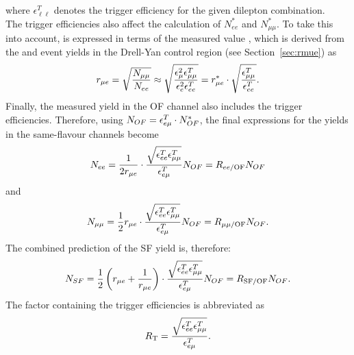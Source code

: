where $\epsilon_{\ell\ell}^T$ denotes the trigger efficiency for the given dilepton combination.\\
The trigger efficiencies also affect the calculation of $N_{ee}^{*}$ and $N_{\mu\mu}^{*}$. To take this into account, \rmuestar is expressed in terms of the measured value \rmue, which is derived from the \EE and \MM event yields in the Drell-Yan control region (see Section~\ref{sec:rmue}) as 
\begin{equation*}
r_{\mu e}  = \sqrt{\frac{N_{\mu\mu}}{N_{ee}}} \approx \sqrt{\frac{\epsilon_{\mu}^2 \epsilon_{\mu\mu}^T}{\epsilon_{e}^2 \epsilon_{ee}^T}} = r_{\mu e}^{*} \cdot \sqrt{\frac{\epsilon_{\mu\mu}^T}{\epsilon_{ee}^T}}.
\end{equation*}
Finally, the measured yield in the OF channel also includes the trigger efficiencies. Therefore, using $N_{OF} = \epsilon_{e\mu}^T \cdot N_{OF}^{*}$, the final expressions for the yields in the same-flavour channels become
\begin{equation}
N_{ee} = \frac{1}{2r_{\mu e}} \cdot \frac{\sqrt{\epsilon_{ee}^T \epsilon_{\mu\mu}^T}}{\epsilon_{e\mu}^T} N_{OF} = R_\text{$ee$/OF} N_{OF}
\label{eq:nee}
\end{equation} 
and
\begin{equation}
N_{\mu\mu} = \frac{1}{2}r_{\mu e}  \cdot \frac{\sqrt{\epsilon_{ee}^T \epsilon_{\mu\mu}^T}}{\epsilon_{e\mu}^T} N_{OF} = R_\text{$\mu\mu$/OF} N_{OF}.
\label{eq:nmm}
\end{equation} 
The combined prediction of the SF yield is, therefore:
\begin{equation}
N_{SF} = \frac{1}{2}\left(r_{\mu e} + \frac{1}{r_{\mu e}}\right) \cdot \frac{\sqrt{\epsilon_{ee}^T \epsilon_{\mu\mu}^T}}{\epsilon_{e\mu}^T}  N_{OF} = R_{\text{SF/OF}} N_{OF}.
\label{eq:nsf}
\end{equation}
The factor containing the trigger efficiencies is abbreviated as
\begin{equation}
R_{\mathrm{T}} = \frac{\sqrt{\epsilon_{ee}^T \epsilon_{\mu\mu}^T}}{\epsilon_{e\mu}^T}.
\label{eq:RT}
\end{equation}
